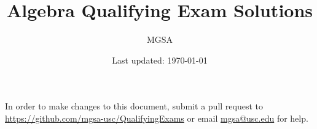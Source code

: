 \documentclass{article}
\begin{document}
\title{Algebra Qualifying Exam Solutions}
\author{MGSA}
\date{Last updated: \today}
\maketitle
In order to make changes to this document, submit a pull request to
\linebreak
\url{https://github.com/mgsa-usc/QualifyingExams}
or email \href{mailto:mgsa@usc.edu}{mgsa@usc.edu} for help.
\tableofcontents
\pagebreak

\pagebreak

\pagebreak

\pagebreak

\end{document}
